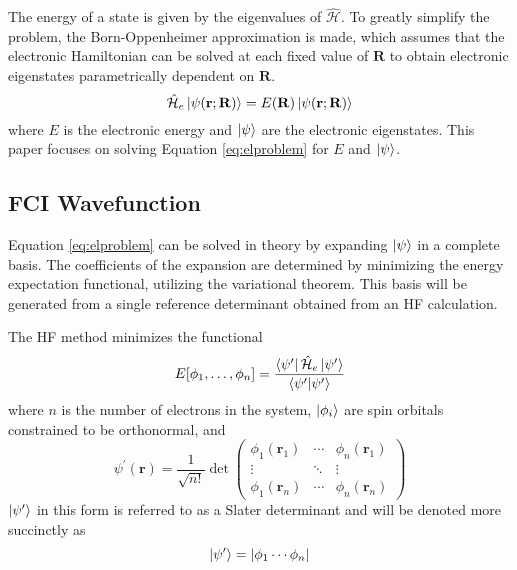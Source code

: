 \documentclass[final,3p,times,twocolumn]{elsarticle}
\newcommand{\ham}{\hat{\mathcal{H}}}
\begin{document}
The energy of a state is given by the eigenvalues of $\ham$. To greatly simplify the problem, the Born-Oppenheimer approximation\cite{bo} is made, which assumes that the electronic Hamiltonian can be solved at each fixed value of $\mathbf{R}$ to obtain electronic eigenstates parametrically dependent on $\mathbf{R}$.
\begin{equation}\label{eq:elproblem}
\ham_e \ket{\psi(\mathbf{r};\mathbf{R})} = E(\mathbf{R}) \ket{\psi(\mathbf{r};\mathbf{R})}
\end{equation}
where $E$ is the electronic energy and $\ket{\psi}$ are the electronic eigenstates. This paper focuses on solving Equation \eqref{eq:elproblem} for $E$ and $\ket{\psi}$.

\subsection{FCI Wavefunction} \label{sec:wf}
Equation \eqref{eq:elproblem} can be solved in theory by expanding $\ket{\psi}$ in a complete basis. The coefficients of the expansion are determined by minimizing the energy expectation functional, utilizing the variational theorem. This basis will be generated from a single reference determinant obtained from an HF calculation. 

The HF method\cite{hartree,fock,roothaan} minimizes the functional
\begin{equation}
E[\phi_1, \ldots, \phi_n] = \dfrac{\bra{\psi^\prime}\ham_e\ket{\psi^\prime}}{\bra{\psi^\prime}\ket{\psi^\prime}}
\end{equation}
where $n$ is the number of electrons in the system, $\ket{\phi_i}$ are spin orbitals constrained to be orthonormal, and 
\begin{equation} \label{eq:det}
\psi^\prime(\mathbf{r}) = \dfrac{1}{\sqrt{n!}}\det\begin{pmatrix} \phi_1(\mathbf{r}_1) & \cdots & \phi_n(\mathbf{r}_1) \\ \vdots & \ddots & \vdots \\
\phi_1(\mathbf{r}_n) & \cdots & \phi_n(\mathbf{r}_n) \end{pmatrix}
\end{equation}
$\ket{\psi^\prime}$ in this form is referred to as a Slater determinant\cite{slater} and will be denoted more succinctly as
\begin{equation}
\ket{\psi^\prime} = |\phi_1 \cdots \phi_n|
\end{equation}
\end{document}
